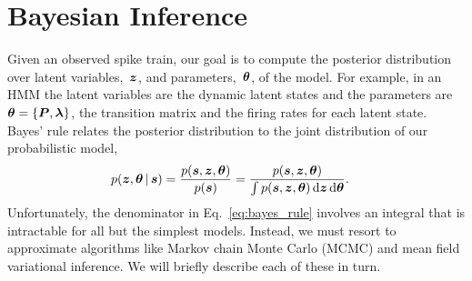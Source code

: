 
\section{Bayesian Inference}
\label{sec:inference_algorithms}
Given an observed spike train, our goal is to compute the posterior
distribution over latent variables,~$\boldsymbol{z}$, and parameters,~$\boldsymbol{\theta}$,
of the model.  For example, in an HMM the latent variables are 
the dynamic latent states and the parameters
are~${\boldsymbol{\theta} = \{\boldsymbol{P}, \boldsymbol{\lambda}\}}$, the transition matrix and the
firing rates for each latent state. Bayes' rule relates the posterior
distribution to the joint distribution of our probabilistic model,
\begin{align}
  \label{eq:bayes_rule}
  p(\boldsymbol{z}, \boldsymbol{\theta} \,|\, \boldsymbol{s}) 
  &= \frac{p(\boldsymbol{s}, \boldsymbol{z}, \boldsymbol{\theta})}{p(\boldsymbol{s})} 
   = \frac{p(\boldsymbol{s}, \boldsymbol{z}, \boldsymbol{\theta})}{\int p(\boldsymbol{s}, \boldsymbol{z}, \boldsymbol{\theta}) \, \mathrm{d}\boldsymbol{z} \, \mathrm{d}\boldsymbol{\theta}} .
\end{align}
Unfortunately, the denominator in Eq.~\ref{eq:bayes_rule} involves an 
integral that is intractable for 
all but the simplest models. Instead, we must resort to approximate 
algorithms like Markov chain Monte Carlo (MCMC) and mean field variational 
inference. We will briefly describe each of these in turn.

